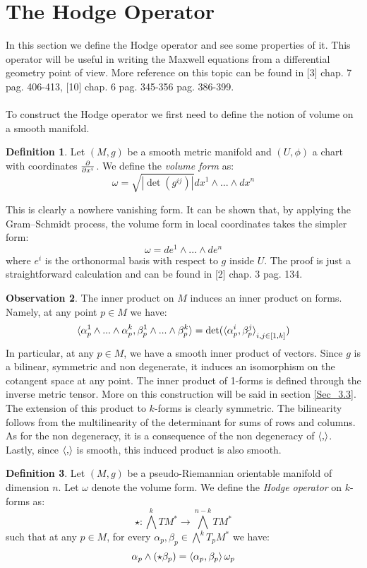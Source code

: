 \documentclass[12pt,a4paper]{report}
\theoremstyle{definition}
\newtheorem{Def}{Definition}[chapter]
\theoremstyle{Theorem}
\theoremstyle{definition}
\theoremstyle{definition}
\newtheorem{Obs}[Def]{Observation}
\begin{document}
	\section{The Hodge Operator}
	In this section we define the Hodge operator and see some properties of it. This operator will be useful in writing the Maxwell equations from a differential geometry point of view. More reference on this topic can be found in [3] chap. 7 pag. 406-413, [10] chap. 6 pag. 345-356 pag. 386-399.\\
	\\
	To construct the Hodge operator we first need to define the notion of volume on a smooth manifold.
	\begin{Def}
		Let $(M,g)$ be a smooth metric manifold and $(U,\phi)$ a chart with coordinates $\partial\over \partial x^i$. We define the \textit{volume form} as:
		$$\omega=\sqrt{|\det(g^{ij})|}dx^1\wedge...\wedge dx^n$$
	\end{Def}
	This is clearly a nowhere vanishing form. It can be shown that, by applying the Gram–Schmidt process, the volume form in local coordinates takes the simpler form:
	$$\omega=de^1\wedge...\wedge de^n$$
	where $e^i$ is the orthonormal basis with respect to $g$ inside $U$. The proof is just a straightforward calculation and can be found in [2] chap. 3 pag. 134.
	\begin{Obs}\label{Obs_1.7.1}
		The inner product on $M$ induces an inner product on forms. Namely, at any point $p\in M$ we have:
		$$\braket{\alpha^1_p\wedge...\wedge \alpha^k_p,\beta^1_p\wedge...\wedge\beta^k_p}=\det(\braket{\alpha^i_p,\beta^j_p}_{i,j\in[1,k]})$$
		In particular, at any $p\in M$, we have a smooth inner product of vectors. Since $g$ is a bilinear, symmetric and non degenerate, it induces an isomorphism on the cotangent space at any point. The inner product of 1-forms is defined through the inverse metric tensor. More on this construction will be said in section \ref{Sec_3.3}.
		The extension of this product to $k$-forms is clearly symmetric. The bilinearity follows from the multilinearity of the determinant for sums of rows and columns. As for the non degeneracy, it is a consequence of the non degeneracy of $\braket{,}$. Lastly, since $\braket{,}$ is smooth, this induced product is also smooth.
	\end{Obs}
	\begin{Def}
		Let $(M,g)$ be a pseudo-Riemannian orientable manifold of dimension $n$. Let $\omega$ denote the volume form. We define the \textit{Hodge operator} on $k$-forms as:
		$$\star:\bigwedge^kTM^*\rightarrow \bigwedge^{n-k}TM^*$$
		such that at any $p\in M$, for every $\alpha_p,\beta_p\in\bigwedge^kT_pM^*$ we have:
		$$\alpha_p\wedge(\star\beta_p)=\braket{\alpha_p,\beta_p}\omega_p$$
	\end{Def}
\end{document}
